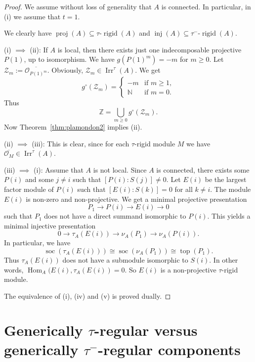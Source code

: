 \documentclass[12pt,reqno]{amsart}
\theoremstyle{definition}
\newcommand{\Z}{\mathbb{Z}}
\newcommand{\N}{\mathbb{N}}
\newcommand{\cO}{{\mathcal O}}
\newcommand{\soc}{\operatorname{soc}}
\newcommand{\tp}{\operatorname{top}}
\newcommand{\proj}{\operatorname{proj}}
\newcommand{\inj}{\operatorname{inj}}
\newcommand{\Hom}{\operatorname{Hom}}
\newcommand{\rigid}{\operatorname{rigid}}
\newcommand{\irr}{\operatorname{Irr}}
\newcommand{\calZ}{\mathcal{Z}}
\begin{document}
\begin{proof}
We assume without loss of generality that $A$ is connected.
In particular,
in (i) we assume that $t=1$.

We clearly have $\proj(A) \subseteq \text{$\tau$-$\rigid(A)$}$
and
$\inj(A) \subseteq  \text{$\tau^-$-$\rigid(A)$}$.

(i) $\implies$ (ii):
If $A$ is local, then there exists just one indecomposable projective
$P(1)$, up to isomorphism.
We have
$g(P(1)^m) = -m$ for $m \ge 0$.
Let $\calZ_m := \overline{\cO_{P(1)^m}}$.
Obviously, $\calZ_m \in \irr^\tau(A)$.
We get
$$
g^\circ(\calZ_m) =
\begin{cases}
-m & \text{if $m \ge 1$},
\\
\N & \text{if $m = 0$}.
\end{cases}
$$
Thus
$$
\Z = \bigcup_{m \ge 0} g^\circ(\calZ_m).
$$
Now Theorem~\ref{thm:plamondon2} implies (ii).

(ii) $\implies$ (iii):
This is clear, since for each $\tau$-rigid module $M$ we have
$\overline{\cO_M} \in \irr^\tau(A)$.

(iii) $\implies$ (i):
Assume that $A$ is not local.
Since $A$ is connected, there exists some $P(i)$ and some
$j \not= i$ such that $[P(i):S(j)] \not= 0$.
Let $E(i)$ be the largest factor module of $P(i)$ such that
$[E(i):S(k)] = 0$ for all $k \not= i$.
The module $E(i)$ is non-zero and non-projective.
We get a minimal projective presentation
$$
P_1 \to P(i) \to E(i) \to 0
$$
such that $P_1$ does not have a direct summand isomorphic to
$P(i)$.
This yields a minimal injective presentation
$$
0 \to \tau_A(E(i)) \to \nu_A(P_1) \to \nu_A(P(i)).
$$
In particular, we have
$$
\soc(\tau_A(E(i))) \cong \soc(\nu_A(P_1)) \cong \tp(P_1).
$$
Thus $\tau_A(E(i))$ does
not have a submodule isomorphic to $S(i)$.
In other words, $\Hom_A(E(i),\tau_A(E(i)) = 0$.
So $E(i)$ is a non-projective $\tau$-rigid module.

The equivalence of (i), (iv) and (v) is proved dually.
\end{proof}



\section{Generically $\tau$-regular versus generically $\tau^-$-regular components}
\label{sec:tauversustauminus}

\end{document}
